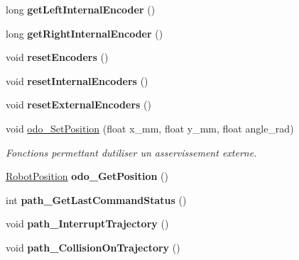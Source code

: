 \begin{DoxyCompactItemize}
long {\bfseries get\+Left\+Internal\+Encoder} ()
\item 
\mbox{\label{classAsservDriver_a00e162296e20e589d7117b2427908aa6}} 
long {\bfseries get\+Right\+Internal\+Encoder} ()
\item 
\mbox{\label{classAsservDriver_a1d4095fd5abc9597f5aa35fc4d02f3fa}} 
void {\bfseries reset\+Encoders} ()
\item 
\mbox{\label{classAsservDriver_a9375c998721a68c0fcdd1c538642fdc6}} 
void {\bfseries reset\+Internal\+Encoders} ()
\item 
\mbox{\label{classAsservDriver_a62108360983265520b0401a71f810f6a}} 
void {\bfseries reset\+External\+Encoders} ()
\item 
\mbox{\label{classAsservDriver_a5806e26618e1b2a4590b67ba55a55165}} 
void \hyperlink{classAsservDriver_a5806e26618e1b2a4590b67ba55a55165}{odo\+\_\+\+Set\+Position} (float x\+\_\+mm, float y\+\_\+mm, float angle\+\_\+rad)
\begin{DoxyCompactList}\small\item\em Fonctions permettant d\textquotesingle{}utiliser un asservissement externe. \end{DoxyCompactList}\item 
\mbox{\label{classAsservDriver_a0a62fbec28bfc5510eb75b6ad434baed}} 
\hyperlink{structRobotPosition}{Robot\+Position} {\bfseries odo\+\_\+\+Get\+Position} ()
\item 
\mbox{\label{classAsservDriver_ac4b8627777e76c145265a8e988852484}} 
int {\bfseries path\+\_\+\+Get\+Last\+Command\+Status} ()
\item 
\mbox{\label{classAsservDriver_affc4e315cdd03c826cea17114d02a19c}} 
void {\bfseries path\+\_\+\+Interrupt\+Trajectory} ()
\item 
\mbox{\label{classAsservDriver_a6af616f39706df060f1b81b2047c7a7f}} 
void {\bfseries path\+\_\+\+Collision\+On\+Trajectory} ()
\item 
\mbox{\label{classAsservDriver_a370b2f287b352211c07a023edcb63bc7}} 

\end{DoxyCompactItemize}
